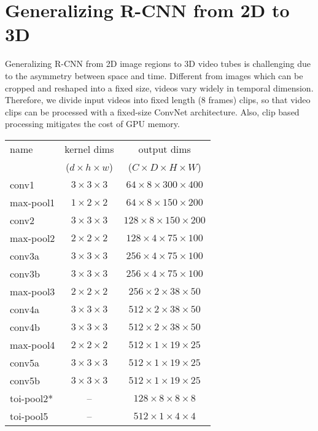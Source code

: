 \documentclass[10pt,twocolumn,letterpaper]{article}
\begin{document}
\section{Generalizing R-CNN from 2D to 3D}
\label{sec:difference}
Generalizing R-CNN from 2D image regions to 3D video tubes is challenging due to the asymmetry between space and time.
Different from images which can be cropped and reshaped into a fixed size, videos vary widely in temporal dimension. Therefore, we divide input videos into fixed length (8 frames) clips, so that video clips  can be processed with a fixed-size ConvNet architecture. Also, clip based processing mitigates the cost of GPU memory.

\begin{table}
\begin{center}
\small
\begin{tabular}{lcc}
\hline
name            & kernel dims        & output dims \\
 &  ($d\times h \times w$) & ($C\times D\times H\times W$) \\
\hline
conv1           & $3\times3\times3$ & $64\times8\times300\times400$ \\
max-pool1       & $1\times2\times2$ & $64\times8\times150\times200$ \\
conv2           & $3\times3\times3$ & $128\times8\times150\times200$ \\
max-pool2       & $2\times2\times2$ & $128\times4\times75\times100$ \\
conv3a          & $3\times3\times3$ & $256\times4\times75\times100$ \\
conv3b          & $3\times3\times3$ & $256\times4\times75\times100$ \\
max-pool3       & $2\times2\times2$ & $256\times2\times38\times50$ \\
conv4a          & $3\times3\times3$ & $512\times2\times38\times50$ \\
conv4b          & $3\times3\times3$ & $512\times2\times38\times50$ \\
max-pool4       & $2\times2\times2$ & $512\times1\times19\times25$ \\
conv5a          & $3\times3\times3$ & $512\times1\times19\times25$ \\
conv5b          & $3\times3\times3$ & $512\times1\times19\times25$ \\
\hline
toi-pool2*      & --                & $128\times8\times8\times8$ \\
toi-pool5       & --                & $512\times1\times4\times4$ \\

\end{tabular}
\end{center}
\end{table}
\end{document}
